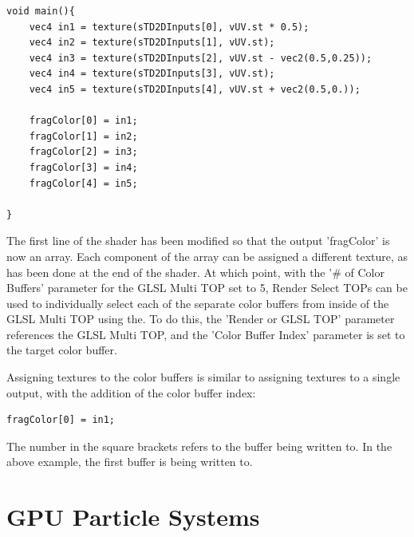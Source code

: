 \begin{fullwidth}
\begin{lstlisting}
void main(){
	vec4 in1 = texture(sTD2DInputs[0], vUV.st * 0.5);
	vec4 in2 = texture(sTD2DInputs[1], vUV.st);
	vec4 in3 = texture(sTD2DInputs[2], vUV.st - vec2(0.5,0.25));
	vec4 in4 = texture(sTD2DInputs[3], vUV.st);
	vec4 in5 = texture(sTD2DInputs[4], vUV.st + vec2(0.5,0.));

	fragColor[0] = in1;
	fragColor[1] = in2;
	fragColor[2] = in3;
	fragColor[3] = in4;
	fragColor[4] = in5;

}
\end{lstlisting}

The first line of the shader has been modified so that the output 'fragColor' is now an array. Each component of the array can be assigned a different texture, as has been done at the end of the shader. At which point, with the '\# of Color Buffers' parameter for the GLSL Multi TOP set to 5, Render Select TOPs can be used to individually select each of the separate color buffers from inside of the GLSL Multi TOP using the. To do this, the 'Render or GLSL TOP' parameter references the GLSL Multi TOP, and the 'Color Buffer Index' parameter is set to the target color buffer.

Assigning textures to the color buffers is similar to assigning textures to a single output, with the addition of the color buffer index:

\begin{lstlisting}
fragColor[0] = in1;
\end{lstlisting}

The number in the square brackets refers to the buffer being written to. In the above example, the first buffer is being written to.

\end{fullwidth}



\section{GPU Particle Systems}


